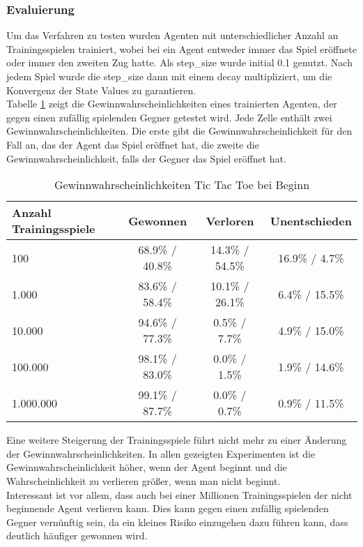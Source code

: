 \documentclass[11pt]{scrartcl}
\begin{document}
\subsubsection{Evaluierung}
Um das Verfahren zu testen wurden Agenten mit unterschiedlicher Anzahl an Trainingsspielen
trainiert, wobei bei ein Agent entweder immer das Spiel eröffnete oder immer den zweiten
Zug hatte. Als step\_size wurde initial 0.1 genutzt. Nach jedem Spiel wurde die step\_size
dann mit einem decay multipliziert, um die Konvergenz der State Values zu garantieren.\\
Tabelle \ref{tab:win_probability_tictactoe_begin} zeigt die Gewinnwahrscheinlichkeiten eines
trainierten Agenten, der gegen einen zufällig spielenden Gegner getestet wird. Jede Zelle
enthält zwei Gewinnwahrscheinlichkeiten. Die erste gibt die Gewinnwahrscheinlichkeit für
den Fall an, das der Agent das Spiel eröffnet hat, die zweite die
Gewinnwahrscheinlichkeit, falls der Gegner das Spiel eröffnet hat.
\begin{table}[h]
  \begin{center}
    \begin{tabular}{l | c | c | c}
      Anzahl Trainingsspiele & Gewonnen & Verloren & Unentschieden \\
      \hline
      100 & 68.9\% / 40.8\% & 14.3\% / 54.5\% & 16.9\% / 4.7\% \\
      1.000 & 83.6\% / 58.4\% & 10.1\% / 26.1\% & 6.4\% / 15.5\% \\
      10.000 & 94.6\% / 77.3\% & 0.5\% / 7.7\% & 4.9\% / 15.0\% \\
      100.000 & 98.1\% / 83.0\% & 0.0\% / 1.5\% & 1.9\% / 14.6\% \\
      1.000.000 & 99.1\% / 87.7\% & 0.0\% / 0.7\% & 0.9\% / 11.5\% \\
    \end{tabular}

    \caption[Gewinnwahrscheinlichkeiten Tic Tac Toe bei Beginn]{Gewinnwahrscheinlichkeiten
      Tic Tac Toe bei Beginn}
    \label{tab:win_probability_tictactoe_begin}
  \end{center}
\end{table}

\noindent
Eine weitere Steigerung der Trainingsspiele führt nicht mehr zu einer Änderung der
Gewinnwahrscheinlichkeiten. In allen gezeigten Experimenten ist die
Gewinnwahrscheinlichkeit höher, wenn der Agent beginnt und die Wahrscheinlichkeit zu
verlieren größer, wenn man nicht beginnt.\\
Interessant ist vor allem, dass auch bei einer Millionen Trainingsspielen der nicht
beginnende Agent verlieren kann. Dies kann gegen einen zufällig spielenden Gegner
vernünftig sein, da ein kleines Risiko einzugehen dazu führen kann, dass deutlich häufiger
gewonnen wird.
\end{document}
